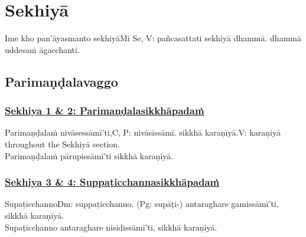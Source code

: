 
\section{Sekhiyā}
\label{sekh}

\begin{intro}
	Ime kho pan'āyasmanto sekhiyā\makeatletter\hyperlink{endnote-appendix}\makeatother Mi Se, V: pañcasattati sekhiyā dhammā.  dhammā uddesaṁ āgacchanti.
\end{intro}

\setsubsecheadstyle{\subsectionFmt}
\subsection{Parimaṇḍalavaggo}

\subsubsection*{\hyperref[training1-2]{Sekhiya 1 \& 2: Parimaṇḍalasikkhāpadaṁ}}
\label{sekh1-2}

Parimaṇḍalaṁ nivāsessāmī'ti,\makeatletter\hyperlink{endnote-appendix}\makeatother C, P: nivāsissāmī. sikkhā karaṇīyā.\makeatletter\hyperlink{endnote-appendix}\makeatother V: karaṇiyā throughout the Sekhiyā section.\\
Parimaṇḍalaṁ pārupissāmī'ti sikkhā karaṇīyā.



\subsubsection*{\hyperref[training3-4]{Sekhiya 3 \& 4: Suppaṭicchannasikkhāpadaṁ}}
\label{sekh3-4}

Supaṭicchanno\makeatletter\hyperlink{endnote-appendix}\makeatother Dm: suppaṭicchanno. (Pg: supāṭi-) antaraghare gamissāmī'ti, sikkhā karaṇīyā.\\
Supaṭicchanno antaraghare nisīdissāmī'ti, sikkhā karaṇīyā.



